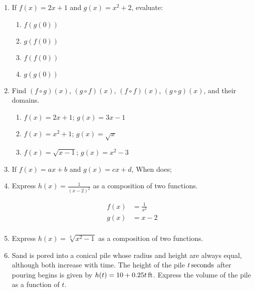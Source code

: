 \documentclass{exam}
\begin{document}
\begin{enumerate}
  \item If $f(x) = 2x + 1$ and $g(x) = x^2 + 2$, evaluate:
    \begin{enumerate}[a]
      \item $f(g(0))$

      \item $g(f(0))$

      \item $f(f(0))$

      \item $g(g(0))$

    \end{enumerate}

  \item Find $(f \circ g)(x)$, $(g \circ f)(x)$, $(f \circ f)(x)$, $(g \circ g)(x)$, and their domains.
    \begin{enumerate}[a]
      \item $f(x) = 2x + 1$; $g(x) = 3x - 1$

      \item $f(x) = x^2 + 1$; $g(x) = \sqrt{x}$

      \item $f(x) = \sqrt{x - 1}$; $g(x) = x^2 - 3$
    \end{enumerate}

  \item If $f(x) = ax + b$ and $g(x) = cx + d$, When does;

  \item Express $h(x) = \frac{1}{(x - 2)^2}$ as a composition of two functions.
    \begin{solution}
      \begin{align*}
        f(x) &= \frac{1}{x^2} \\
        g(x) &= x - 2 \\
      \end{align*}
    \end{solution}

  \item Express $h(x) = \sqrt[3]{x^2 - 1}$ as a composition of two functions.

  \item Sand is pored into a conical pile whose radius and height are always equal, although both increase with time.
    The height of the pile $\unit[t]{seconds}$ after pouring begins is given by $h(t) = \unit[10 + 0.25t]{ft}$.  Express the
    volume of the pile as a function of $t$.


\end{enumerate}
\end{document}
